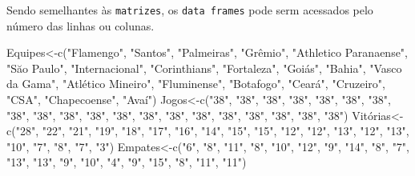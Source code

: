 \documentclass[
]{book}
\newenvironment{Shaded}{\begin{snugshade}}{\end{snugshade}}
\newcommand{\FunctionTok}[1]{\textcolor[rgb]{0.00,0.00,0.00}{#1}}
\newcommand{\NormalTok}[1]{#1}
\newcommand{\OtherTok}[1]{\textcolor[rgb]{0.56,0.35,0.01}{#1}}
\newcommand{\StringTok}[1]{\textcolor[rgb]{0.31,0.60,0.02}{#1}}
\begin{document}
Sendo semelhantes às \texttt{matrizes}, os \texttt{data\ frames} pode serm acessados pelo número das linhas ou colunas.

\begin{Shaded}
\begin{Highlighting}[]
\NormalTok{Equipes}\OtherTok{\textless{}{-}}\FunctionTok{c}\NormalTok{(}\StringTok{"Flamengo"}\NormalTok{,  }\StringTok{"Santos"}\NormalTok{,   }\StringTok{"Palmeiras"}\NormalTok{,    }\StringTok{"Grêmio"}\NormalTok{,   }\StringTok{"Athletico Paranaense"}\NormalTok{, }\StringTok{"Săo Paulo"}\NormalTok{,    }\StringTok{"Internacional"}\NormalTok{,    }\StringTok{"Corinthians"}\NormalTok{,  }\StringTok{"Fortaleza"}\NormalTok{,    }\StringTok{"Goiás"}\NormalTok{,    }\StringTok{"Bahia"}\NormalTok{,    }\StringTok{"Vasco da Gama"}\NormalTok{,    }\StringTok{"Atlético Mineiro"}\NormalTok{, }\StringTok{"Fluminense"}\NormalTok{,   }\StringTok{"Botafogo"}\NormalTok{, }\StringTok{"Ceará"}\NormalTok{,    }\StringTok{"Cruzeiro"}\NormalTok{, }\StringTok{"CSA"}\NormalTok{,  }\StringTok{"Chapecoense"}\NormalTok{,  }\StringTok{"Avaí"}\NormalTok{)}
\NormalTok{Jogos}\OtherTok{\textless{}{-}}\FunctionTok{c}\NormalTok{(}\StringTok{"38"}\NormalTok{,  }\StringTok{"38"}\NormalTok{,   }\StringTok{"38"}\NormalTok{,   }\StringTok{"38"}\NormalTok{,   }\StringTok{"38"}\NormalTok{,   }\StringTok{"38"}\NormalTok{,   }\StringTok{"38"}\NormalTok{,   }\StringTok{"38"}\NormalTok{,   }\StringTok{"38"}\NormalTok{,   }\StringTok{"38"}\NormalTok{,   }\StringTok{"38"}\NormalTok{,   }\StringTok{"38"}\NormalTok{,   }\StringTok{"38"}\NormalTok{,   }\StringTok{"38"}\NormalTok{,   }\StringTok{"38"}\NormalTok{,   }\StringTok{"38"}\NormalTok{,   }\StringTok{"38"}\NormalTok{,   }\StringTok{"38"}\NormalTok{,   }\StringTok{"38"}\NormalTok{,   }\StringTok{"38"}\NormalTok{)}
\NormalTok{Vitórias}\OtherTok{\textless{}{-}}\FunctionTok{c}\NormalTok{(}\StringTok{"28"}\NormalTok{,   }\StringTok{"22"}\NormalTok{,   }\StringTok{"21"}\NormalTok{,   }\StringTok{"19"}\NormalTok{,   }\StringTok{"18"}\NormalTok{,   }\StringTok{"17"}\NormalTok{,   }\StringTok{"16"}\NormalTok{,   }\StringTok{"14"}\NormalTok{,   }\StringTok{"15"}\NormalTok{,   }\StringTok{"15"}\NormalTok{,   }\StringTok{"12"}\NormalTok{,   }\StringTok{"12"}\NormalTok{,   }\StringTok{"13"}\NormalTok{,   }\StringTok{"12"}\NormalTok{,   }\StringTok{"13"}\NormalTok{,   }\StringTok{"10"}\NormalTok{,   }\StringTok{"7"}\NormalTok{,    }\StringTok{"8"}\NormalTok{,    }\StringTok{"7"}\NormalTok{,    }\StringTok{"3"}\NormalTok{)}
\NormalTok{Empates}\OtherTok{\textless{}{-}}\FunctionTok{c}\NormalTok{(}\StringTok{"6"}\NormalTok{, }\StringTok{"8"}\NormalTok{,    }\StringTok{"11"}\NormalTok{,   }\StringTok{"8"}\NormalTok{,    }\StringTok{"10"}\NormalTok{,   }\StringTok{"12"}\NormalTok{,   }\StringTok{"9"}\NormalTok{,    }\StringTok{"14"}\NormalTok{,   }\StringTok{"8"}\NormalTok{,    }\StringTok{"7"}\NormalTok{,    }\StringTok{"13"}\NormalTok{,   }\StringTok{"13"}\NormalTok{,   }\StringTok{"9"}\NormalTok{,    }\StringTok{"10"}\NormalTok{,   }\StringTok{"4"}\NormalTok{,    }\StringTok{"9"}\NormalTok{,    }\StringTok{"15"}\NormalTok{,   }\StringTok{"8"}\NormalTok{,    }\StringTok{"11"}\NormalTok{,   }\StringTok{"11"}\NormalTok{)}

\end{Highlighting}
\end{Shaded}
\end{document}
